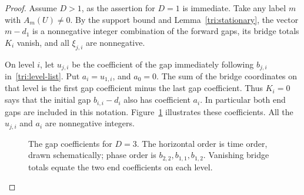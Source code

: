 \begin{proof}
Assume $D>1$, as the assertion for $D=1$ is immediate.  Take any
label $m$ with $A_m(U)\ne0$.  By the support bound and
Lemma~\ref{tri:stationary}, the vector $m-d_1$ is a nonnegative
integer combination of the forward gaps, its bridge totals $K_i$
vanish, and all $\xi_{j,i}$ are nonnegative.

On level $i$, let $u_{j,i}$ be the coefficient of the gap immediately
following $b_{j,i}$ in~\eqref{tri:level-list}.  Put $a_i=u_{1,i}$,
and $a_0=0$.  The sum of the bridge coordinates on that level is
the first gap coefficient minus the last gap coefficient.  Thus
$K_i=0$ says that the initial gap $b_{i,i}-d_i$ also has coefficient
$a_i$.  In particular both end gaps are included in this notation.
Figure~\ref{tri:gap-figure} illustrates these coefficients.
All the $u_{j,i}$ and $a_i$ are nonnegative integers.

\begin{figure}[ht]
\centering
{}
\caption{The gap coefficients for $D=3$.  The horizontal order is time
order, drawn schematically; phase order is
$b_{2,2},b_{1,1},b_{1,2}$.  Vanishing bridge totals equate the two
end coefficients on each level.}
\label{tri:gap-figure}
\end{figure}


\end{proof}
